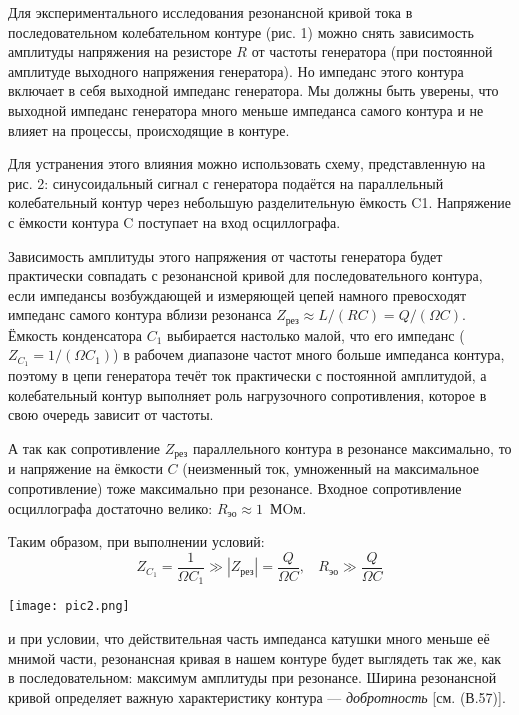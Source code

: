 Для экспериментального исследования резонансной кривой тока в последовательном
колебательном контуре (рис. 1) можно снять зависимость
амплитуды напряжения на резисторе $R$ от частоты генератора (при постоянной амплитуде выходного напряжения генератора). Но импеданс этого
контура включает в себя выходной импеданс генератора. Мы должны быть уверены, что выходной импеданс генератора много меньше импеданса самого контура
и не влияет на процессы, происходящие в контуре.

Для
устранения этого влияния можно использовать схему, представленную
на рис. 2: синусоидальный сигнал с генератора подаётся на параллельный
колебательный
контур через небольшую
разделительную ёмкость
C1. Напряжение с ёмкости
контура C поступает на
вход осциллографа.



Зависимость амплитуды этого напряжения от частоты генератора будет
практически совпадать с резонансной
кривой для последовательного
контура, если импедансы возбуждающей
и
измеряющей цепей намного превосходят импеданс самого контура вблизи
резонанса $Z_{\text{рез}} \approx L/(RC) = Q/(\Omega C)$. Ёмкость
конденсатора $C_1$ выбирается настолько малой, что его импеданс ($Z_{C_1} = 1/(\Omega C_1)$) в рабочем диапазоне
частот много больше импеданса контура, поэтому в цепи генератора течёт ток практически с постоянной амплитудой,
а
колебательный
контур
выполняет роль нагрузочного сопротивления,
которое в свою очередь зависит от частоты.

А так
как сопротивление
$Z_{\text{рез}}$ параллельного
контура
в резонансе максимально, то
и напряжение на ёмкости
$C$ (неизменный
ток, умноженный на максимальное сопротивление) тоже максимально
при резонансе. Входное сопротивление осциллографа достаточно велико:
$R_{\text{эо}} \approx 1$~МOм.

Таким образом, при выполнении
условий:
\begin{equation}\label{1}
    Z_{C_1} = \frac{1}{\Omega C_1} \gg |Z_{\text{рез}}| = \frac{Q}{\Omega C},~~~~R_{\text{эо}} \gg \frac{Q}{\Omega C}
\end{equation}

\texttt{[image: pic2.png]}

и при
условии, что действительная часть импеданса
катушки много меньше её мнимой части, резонансная кривая в нашем
контуре будет выглядеть так
же,
как в последовательном: максимум амплитуды при резонансе. Ширина резонансной кривой определяет важную
характеристику
контура
— \textit{добротность} 
[см. (В.57)].

